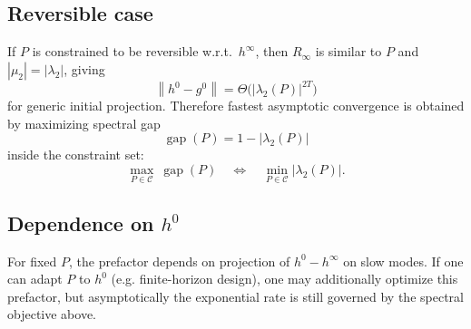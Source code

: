 \documentclass[11pt]{article}
\newcommand{\norm}[1]{\left\lVert #1\right\rVert}
\begin{document}
\subsection*{Reversible case}
If $P$ is constrained to be reversible w.r.t.\ $h^\infty$, then $R_\infty$ is similar to $P$ and $|\mu_2|=|\lambda_2|$, giving
\[
\norm{h^0-g^0}=\Theta\!\big(|\lambda_2(P)|^{2T}\big)
\]
for generic initial projection. Therefore fastest asymptotic convergence is obtained by maximizing spectral gap
\[
\operatorname{gap}(P)=1-|\lambda_2(P)|
\]
inside the constraint set:
\[
\max_{P\in\mathcal C}\ \operatorname{gap}(P)
\quad\Longleftrightarrow\quad
\min_{P\in\mathcal C} |\lambda_2(P)|.
\]

\subsection*{Dependence on $h^0$}
For fixed $P$, the prefactor depends on projection of $h^0-h^\infty$ on slow modes. If one can adapt $P$ to $h^0$ (e.g. finite-horizon design), one may additionally optimize this prefactor, but asymptotically the exponential rate is still governed by the spectral objective above.
\end{document}
